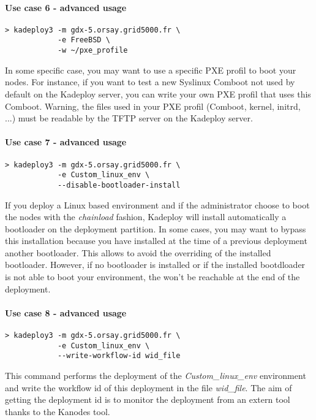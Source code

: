 \documentclass[a4wide,10pt,oneside]{book}
\begin{document}
\paragraph{Use case 6 - advanced usage}
\begin{verbatim}
> kadeploy3 -m gdx-5.orsay.grid5000.fr \
            -e FreeBSD \
            -w ~/pxe_profile
\end{verbatim}
In some specific case, you may want to use a specific PXE profil to boot your nodes. For instance, if you want to test a new Syslinux Comboot not used by default on the Kadeploy server, you can write your own PXE profil that uses this Comboot. Warning, the files used in your PXE profil (Comboot, kernel, initrd, ...) must be readable by the TFTP server on the Kadeploy server.

\paragraph{Use case 7 - advanced usage}
\begin{verbatim}
> kadeploy3 -m gdx-5.orsay.grid5000.fr \
            -e Custom_linux_env \
            --disable-bootloader-install
\end{verbatim}
If you deploy a Linux based environment and if the administrator choose to boot the nodes with the \textit{chainload} fashion, Kadeploy will install automatically a bootloader on the deployment partition. In some cases, you may want to bypass this installation because you have installed at the time of a previous deployment another bootloader. This allows to avoid the overriding of the installed bootloader. However, if no bootloader is installed or if the installed bootdloader is not able to boot your environment, the won't be reachable at the end of the deployment.

\paragraph{Use case 8 - advanced usage}\label{par:usecase-wid}
\begin{verbatim}
> kadeploy3 -m gdx-5.orsay.grid5000.fr \
            -e Custom_linux_env \
            --write-workflow-id wid_file
\end{verbatim}
This command performs the deployment of the \textit{Custom\_linux\_env} environment and write the workflow id of this deployment in the file \textit{wid\_file}. The aim of getting the deployment id is to monitor the deployment from an extern tool thanks to the Kanodes tool.
\end{document}
